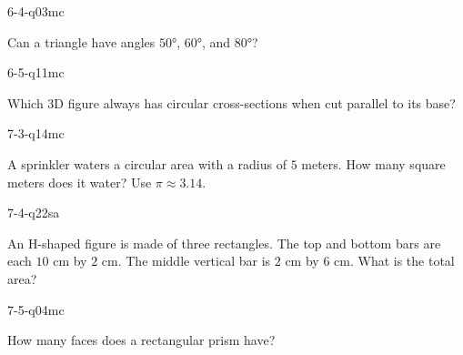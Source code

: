 \begin{practiceQuestion}{6-4-q03}{mc}
\begin{questionText}
Can a triangle have angles $50°$, $60°$, and $80°$?
\end{questionText}
\end{practiceQuestion}

\begin{practiceQuestion}{6-5-q11}{mc}
\begin{questionText}
Which 3D figure always has circular cross-sections when cut parallel to its base?
\end{questionText}
\end{practiceQuestion}

\begin{practiceQuestion}{7-3-q14}{mc}
\begin{questionText}
A sprinkler waters a circular area with a radius of $5$ meters. How many square meters does it water? Use $\pi \approx 3.14$.
\end{questionText}
\end{practiceQuestion}

\begin{practiceQuestion}{7-4-q22}{sa}
\begin{questionText}
An H-shaped figure is made of three rectangles. The top and bottom bars are each $10$ cm by $2$ cm. The middle vertical bar is $2$ cm by $6$ cm. What is the total area?
\end{questionText}
\end{practiceQuestion}

\begin{practiceQuestion}{7-5-q04}{mc}
\begin{questionText}
How many faces does a rectangular prism have?
\end{questionText}
\end{practiceQuestion}

